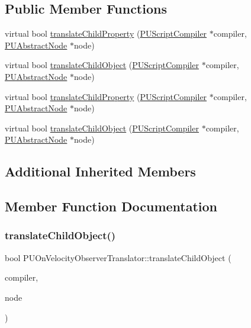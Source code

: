 \subsection*{Public Member Functions}
\begin{DoxyCompactItemize}
\item 
virtual bool \hyperlink{classPUOnVelocityObserverTranslator_aa44d7a735f155168fcd5f67cb450e159}{translate\+Child\+Property} (\hyperlink{classPUScriptCompiler}{P\+U\+Script\+Compiler} $\ast$compiler, \hyperlink{classPUAbstractNode}{P\+U\+Abstract\+Node} $\ast$node)
\item 
virtual bool \hyperlink{classPUOnVelocityObserverTranslator_a09b28d15436b206c9b9a24a45189d814}{translate\+Child\+Object} (\hyperlink{classPUScriptCompiler}{P\+U\+Script\+Compiler} $\ast$compiler, \hyperlink{classPUAbstractNode}{P\+U\+Abstract\+Node} $\ast$node)
\item 
virtual bool \hyperlink{classPUOnVelocityObserverTranslator_ad7b680fc8d51b8f40f6412ec38cfcb1e}{translate\+Child\+Property} (\hyperlink{classPUScriptCompiler}{P\+U\+Script\+Compiler} $\ast$compiler, \hyperlink{classPUAbstractNode}{P\+U\+Abstract\+Node} $\ast$node)
\item 
virtual bool \hyperlink{classPUOnVelocityObserverTranslator_a935b5d358c24effd602e203790aa3b2a}{translate\+Child\+Object} (\hyperlink{classPUScriptCompiler}{P\+U\+Script\+Compiler} $\ast$compiler, \hyperlink{classPUAbstractNode}{P\+U\+Abstract\+Node} $\ast$node)
\end{DoxyCompactItemize}
\subsection*{Additional Inherited Members}


\subsection{Member Function Documentation}
\mbox{\label{classPUOnVelocityObserverTranslator_a09b28d15436b206c9b9a24a45189d814}} 
\subsubsection{\texorpdfstring{translate\+Child\+Object()}{translateChildObject()}\hspace{0.1cm}{\footnotesize\ttfamily [1/2]}}
{\footnotesize\ttfamily bool P\+U\+On\+Velocity\+Observer\+Translator\+::translate\+Child\+Object (\begin{DoxyParamCaption}\item[{\hyperlink{classPUScriptCompiler}{P\+U\+Script\+Compiler} $\ast$}]{compiler,  }\item[{\hyperlink{classPUAbstractNode}{P\+U\+Abstract\+Node} $\ast$}]{node }\end{DoxyParamCaption})\hspace{0.3cm}{\ttfamily [virtual]}}

